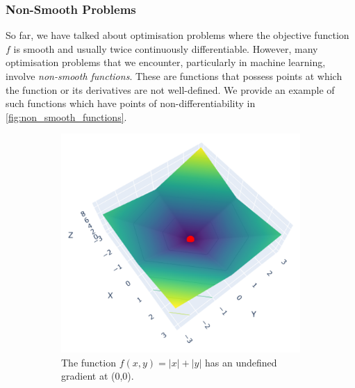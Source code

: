 \subsubsection{Non-Smooth Problems}
\label{sssec:non_smooth_problems}

So far, we have talked about optimisation problems where the objective function $f$ is smooth and usually twice continuously differentiable. However, many optimisation problems that we encounter, particularly in machine learning, involve \textit{non-smooth functions}. These are functions that possess points at which the function or its derivatives are not well-defined. We provide an example of such functions which have points of non-differentiability in \cref{fig:non_smooth_functions}. 

\begin{figure}[h]
    \begin{subfigure}[b]{0.48\linewidth}
        \centering
        \includegraphics[width=\linewidth]{figures/2background/abs_func.png}
        \caption{The function
        $f(x, y) = |x| + |y|$ has an undefined gradient at (0,0).}
        \label{fig:abs_function}
    \end{subfigure}
    \hfill
    \begin{subfigure}[b]{0.48\linewidth}
        \centering

\end{subfigure}
\end{figure}
